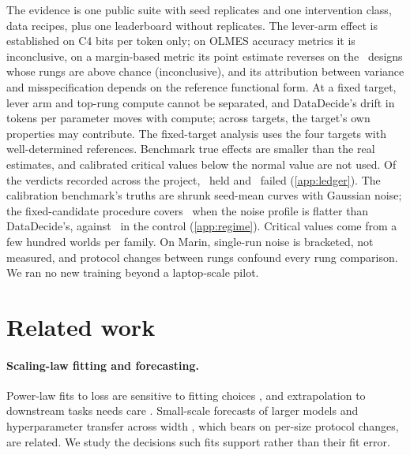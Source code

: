 \documentclass{article}
\begin{document}
The evidence is one public suite with seed replicates and one intervention
class, data recipes, plus one leaderboard without replicates. The lever-arm effect
is established on C4 bits per token only; on OLMES accuracy metrics it is
inconclusive, on a margin-based metric its point estimate reverses on the
\lamMarginSubN\ designs whose rungs are above chance (inconclusive), and its attribution between variance and misspecification depends
on the reference functional form. At a fixed target, lever arm and top-rung
compute cannot be separated, and DataDecide's drift in tokens per parameter
moves with compute; across targets, the target's own properties may contribute.
The fixed-target analysis uses the four targets with well-determined references.  %
Benchmark true effects are smaller than the real estimates, and calibrated
critical values below the normal value are not used. Of the verdicts recorded across the project,
\ledgerHeld\ held and \ledgerFailed\ failed (\cref{app:ledger}). The calibration benchmark's truths are
shrunk seed-mean curves with Gaussian noise; the fixed-candidate procedure
covers \calFlatFixedCov\ when the noise profile is flatter than DataDecide's,
against \calControlFixedCov\ in the control (\cref{app:regime}).
Critical values come from a few hundred worlds per family. On Marin, single-run  %
noise is bracketed, not measured, and protocol changes between rungs confound
every rung comparison. We ran no new training beyond a laptop-scale pilot.

\section{Related work}
\label{sec:related}

\paragraph{Scaling-law fitting and forecasting.} Power-law fits to loss
\citep{kaplan2020scaling,hoffmann2022training} are sensitive to fitting choices
\citep{besiroglu2024chinchilla,choshen2024hitchhiker}, and extrapolation to
downstream tasks needs care \citep{gadre2024language,bhagia2024establishing}.
Small-scale forecasts of larger models \citep{ivgi2022scaling,ruan2024observational}
and hyperparameter transfer across width \citep{yang2022tensor}, which bears on
per-size protocol changes, are related. We study the decisions such fits
support rather than their fit error.
\end{document}
